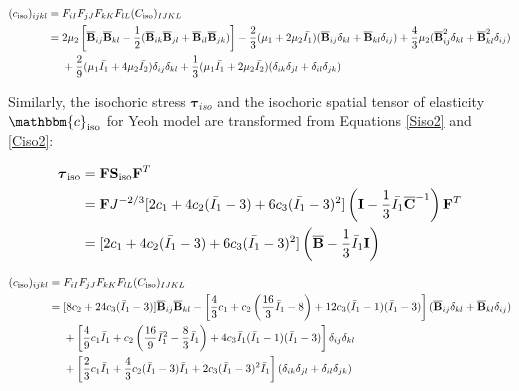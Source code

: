 \begin{appendices}
\begin{equation} \label{spatial_ciso1}
\begin{split}
(c_\mathrm{iso})_{ijkl} = {}&  F_{iI}F_{jJ}F_{kK}F_{lL}(C_\mathrm{iso})_{IJKL} \\
= {} &
2\mu_2 \left[{\overline{\bold{B}}}_{ij} {\overline{\bold{B}}}_{kl} - \frac{1}{2}({\overline{\bold{B}}}_{ik}{\overline{\bold{B}}}_{jl} + {\overline{\bold{B}}}_{il}{\overline{\bold{B}}}_{jk}) \right] 
- \frac{2}{3}(\mu_1 + 2\mu_2\bar{I_1})({\overline{\bold{B}}}_{ij}\delta_{kl} + {\overline{\bold{B}}}_{kl}\delta_{ij}) 
+ \frac{4}{3}\mu_2({\overline{\bold{B}}}^2_{ij}\delta_{kl} + {\overline{\bold{B}}}^2_{kl}\delta_{ij}) \\
&+
\frac{2}{9}(\mu_1\bar{I_1} + 4\mu_2\bar{I_2}) \delta_{ij}\delta_{kl}
+ \frac{1}{3}(\mu_1\bar{I_1} + 2\mu_2\bar{I_2})(\delta_{ik}\delta_{jl} + \delta_{il}\delta_{jk})
\end{split}
\end{equation} 

Similarly, the isochoric stress $\boldsymbol{\tau}_{iso}$ and the isochoric spatial tensor of elasticity $\mathbbm{c}_\mathrm{iso}$ for Yeoh model are transformed from Equations \ref{Siso2} and \ref{Ciso2}:

\begin{equation} \label{Tauiso2}
\begin{split}
\boldsymbol{\tau}_\mathrm{iso} 
&= \bold{F}\bold{S}_\mathrm{iso}{\bold{F}}^T \\
&= \bold{F}  J^{-2/3}[2c_1 + 4c_2(\bar{I_1} - 3) + 6c_3(\bar{I_1} - 3)^2] \left(\bold{I} - \frac{1}{3}\bar{I_1}{\overline{\bold{C}}}^{-1} \right)  \bold{F}^T \\
&= [2c_1 + 4c_2(\bar{I_1} - 3) + 6c_3(\bar{I_1} - 3)^2] \left(\overline{\bold{B}} - \frac{1}{3}\bar{I}_1\bold{I} \right)
\end{split}
\end{equation}

\begin{equation} \label{spatial_ciso2}
\begin{split}
(c_\mathrm{iso})_{ijkl} = {} &  F_{iI}F_{jJ}F_{kK}F_{lL}(C_\mathrm{iso})_{IJKL} \\
= {}& 
[8c_2+24c_3({\bar{I}}_1 - 3)] {\overline{\bold{B}}}_{ij}{\overline{\bold{B}}}_{kl} 
- \left[\frac{4}{3}c_1 + c_2\left(\frac{16}{3}{\bar{I}}_1 - 8\right) + 12c_3({\bar{I}}_1 - 1)({\bar{I}}_1 - 3)\right]({\overline{\bold{B}}}_{ij}\delta_{kl} + {\overline{\bold{B}}}_{kl}\delta_{ij}) \\
&+ \left[\frac{4}{9}c_1{\bar{I}}_1 + c_2\left(\frac{16}{9}{{\bar{I}}_1}^2 - \frac{8}{3}{\bar{I}}_1\right) + 4c_3{\bar{I}}_1({\bar{I}}_1 - 1)({\bar{I}}_1 - 3)\right] \delta_{ij}\delta_{kl} \\
&+ \left[\frac{2}{3}c_1{\bar{I}}_1 + \frac{4}{3}c_2({\bar{I}}_1 - 3){\bar{I}}_1 + 2c_3({\bar{I}}_1 - 3)^2{\bar{I}}_1\right](\delta_{ik}\delta_{jl} + \delta_{il}\delta_{jk})
\end{split}
\end{equation} 


\end{appendices}
